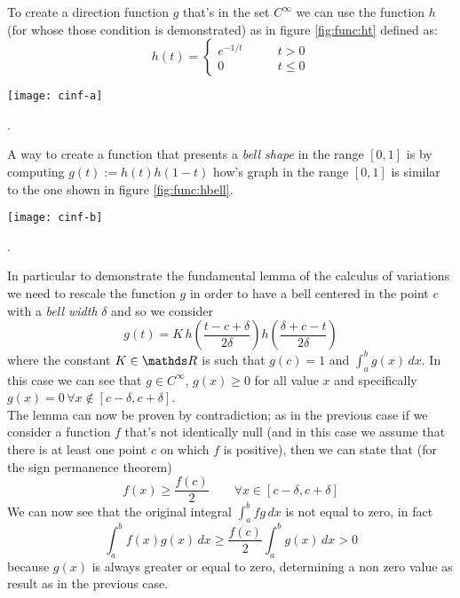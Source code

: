 	To create a direction function $g$ that's in the set $C^\infty$ we can use the function $h$(for whose those condition is demonstrated) as in figure \ref{fig:func:ht} defined as:
	\begin{equation} \label{eq:func:ht}
		h(t) = \begin{cases}
			e^{-1/t} \qquad & t > 0 \\ 
			0 & t\leq 0
		\end{cases}
	\end{equation}
	\begin{SCfigure}[2][bt]
		\centering \texttt{[image: cinf-a]}
		\caption{representation of $h(t)$ defined in equation \ref{eq:func:ht}}.
		\label{fig:func:ht}
	\end{SCfigure}

	A way to create a function that presents a \textit{bell shape} in the range $[0,1]$ is by computing $g(t) := h(t) h(1-t)$ how's graph in the range $[0,1]$ is similar to the one shown in figure \ref{fig:func:hbell}.
	
	\begin{SCfigure}[2][bht]
		\centering \texttt{[image: cinf-b]}
		\caption{representation of the function $g(t):=h(t)h(1-t)$, where $h(t)$ is defined in equation \ref{eq:func:ht}}.
		\label{fig:func:hbell}
	\end{SCfigure}
	
	In particular to demonstrate the fundamental lemma of the calculus of variations we need to rescale the function $g$ in order to have a bell centered in the point $c$ with a \textit{bell width} $\delta$ and so we consider
	\[ g(t) = K \, h\left(\frac{t-c+\delta}{2 \delta}\right) h\left( \frac{\delta + c - t}{2 \delta} \right) \] 
	where the constant $K\in\R$ is such that $g(c)=1$ and $\int_a^bg(x)\, dx$. In this case we can see that $g\in C^\infty$, $g(x) \geq 0 $ for all value $x$ and specifically $g(x) = 0 \, \forall x\notin[c-\delta,c+\delta]$.\\
	The lemma can now be proven by contradiction; as in the previous case if we consider a function $f$ that's not identically null (and in this case we assume that there is at least one point $c$ on which $f$ is positive), then we can state that (for the sign permanence theorem)
	\[ f(x) \geq \frac{f(c)}{2} \qquad \forall x \in [c-\delta,c+\delta] \] 
	We can now see that the original integral $\int_a^b fg\, dx$ is not equal to zero, in fact
	\[ \int_a^b f(x)g(x)\, dx \geq \frac{f(c)}{2}\int_a^bg(x)\, dx > 0 \]
	because $g(x)$ is always greater or equal to zero, determining a non zero value as result as in the previous case.
	
